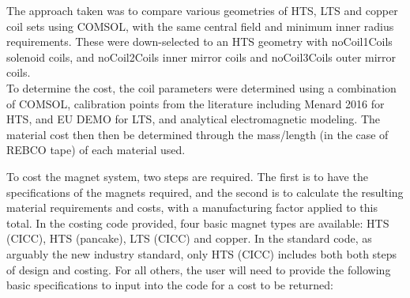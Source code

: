 The approach taken was to compare various geometries of HTS, LTS and copper coil sets using COMSOL, with the same central field and minimum inner radius requirements. These were down-selected to an HTS geometry with noCoil1Coils solenoid coils, and noCoil2Coils inner mirror coils and noCoil3Coils outer mirror coils.\\

To determine the cost, the coil parameters were determined using a combination of COMSOL, calibration points from the literature including Menard 2016
for HTS, and EU DEMO for LTS, and analytical electromagnetic modeling. The material cost then then be determined through the mass/length (in the case of REBCO tape) of each material used.

To cost the magnet system, two steps are required. The first is to have the specifications of the magnets required, and the second is to calculate the resulting material requirements and costs, with a manufacturing factor applied to this total. In the costing code provided, four basic magnet types are available: HTS (CICC), HTS (pancake), LTS (CICC) and copper. In the standard code, as arguably the new industry standard, only HTS (CICC) includes both both steps of design and costing. For all others, the user will need to provide the following basic specifications to input into the code for a cost to be returned:

